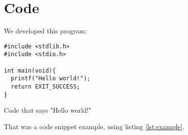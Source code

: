 \chapter{Code}
We developed this program:

\begin{listing}[H]
\begin{verbatim}
#include <stdlib.h>
#include <stdio.h>

int main(void){
  printf("Hello world!");
  return EXIT_SUCCESS;
}
\end{verbatim}
\caption{Code that says "Hello world!"}
\label{lst:example}
\end{listing}

That was a code snippet example, using listing \ref{lst:example}.
